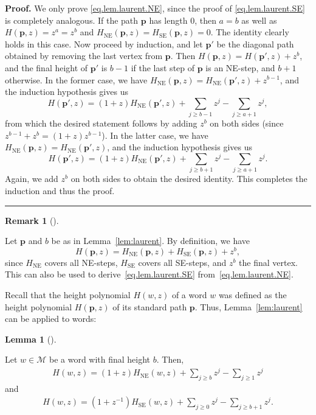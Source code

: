 \documentclass[numbers=enddot,12pt,final,onecolumn,notitlepage]{scrartcl}%
\theoremstyle{definition}
\newtheorem{lem}[theo]{Lemma}
\newenvironment{lemma}[1][]
{\begin{lem}[#1]\begin{leftbar}}
{\end{leftbar}\end{lem}}
\newtheorem{remk}[theo]{Remark}
\newenvironment{remark}[1][]
{\begin{remk}[#1]\begin{leftbar}}
{\end{leftbar}\end{remk}}
\newenvironment{proof}[1][Proof]{\noindent\textbf{#1.} }{\ \rule{0.5em}{0.5em}}
\newcommand{\M}{\mathcal{M}}
\newcommand{\pp}{\mathbf{p}}
\newcommand{\SE}{\operatorname{SE}}
\newcommand{\NE}{\operatorname{NE}}
\newcommand{\tup}[1]{\left( #1 \right)}
\begin{document}
\begin{proof}
We only prove \eqref{eq.lem.laurent.NE}, since the proof of \eqref{eq.lem.laurent.SE} is completely analogous.
If the path $\pp$ has length $0$, then $a = b$ as well as $H(\pp,z) = z^a = z^b$ and $H_{\NE}(\pp,z) = H_{\SE}(\pp,z) = 0$.
The identity clearly holds in this case.
Now proceed by induction, and let $\pp'$ be the diagonal path obtained by removing the last vertex from $\pp$.
Then $H(\pp,z) = H(\pp',z) + z^b$, and the final height of $\pp'$ is $b-1$ if the last step of $\pp$ is an NE-step, and $b+1$ otherwise.
In the former case, we have $H_{\NE}(\pp,z) = H_{\NE}(\pp',z) + z^{b-1}$, and the induction hypothesis gives us
\[
H(\pp',z) = (1+z)H_{\NE}(\pp',z) + \sum_{j \geq b-1} z^j - \sum_{j \geq a+1} z^j,
\]
from which the desired statement follows by adding $z^b$ on both sides (since $z^{b-1} + z^b = \tup{1+z} z^{b-1}$).
In the latter case, we have $H_{\NE}(\pp,z) = H_{\NE}(\pp',z)$, and the induction hypothesis gives us
\[
H(\pp',z) = (1+z)H_{\NE}(\pp',z) + \sum_{j \geq b+1} z^j - \sum_{j \geq a+1} z^j.
\]
Again, we add $z^b$ on both sides to obtain the desired identity. This completes the induction and thus the proof.
\end{proof}

\begin{remark}
Let $\pp$ and $b$ be as in Lemma~\ref{lem:laurent}.
By definition, we have
\[H(\pp,z) = H_{\NE}(\pp,z) + H_{\SE}(\pp,z) + z^b,\]
since $H_{\NE}$ covers all NE-steps, $H_{\SE}$ covers all SE-steps, and $z^b$ the final vertex. This can also be used to derive~\eqref{eq.lem.laurent.SE} from~\eqref{eq.lem.laurent.NE}.
\end{remark}

Recall that the height polynomial $H\tup{w, z}$ of a word $w$ was defined as the height polynomial $H\tup{\pp, z}$ of its standard path $\pp$.
Thus, Lemma~\ref{lem:laurent} can be applied to words:

\begin{lemma}\label{lem:laurent-w}
Let $w \in \M$ be a word with final height $b$. Then,
\begin{align}
    H(w,z) = (1+z)H_{\NE}(w,z) + \sum_{j \geq b} z^j - \sum_{j \geq 1} z^j
    \label{eq.lem.laurent-w.NE}
\end{align}
and
\begin{align}
    H(w,z) = (1+z^{-1})H_{\SE}(w,z) + \sum_{j \geq 0} z^j - \sum_{j \geq b+1} z^j.
    \label{eq.lem.laurent-w.SE}
\end{align}
\end{lemma}
\end{document}
